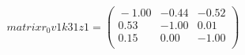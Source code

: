 \documentclass[10pt,a4paper]{article}
\begin{document}
 \begin{equation*} matrixr_0v1k31z1  =  %
\begin{pmatrix}{}
  -1.00 & -0.44 & -0.52 \\ 
  0.53 & -1.00 & 0.01 \\ 
  0.15 & 0.00 & -1.00 \\ 
  \end{pmatrix}
 \end{equation*} 
\end{document}

